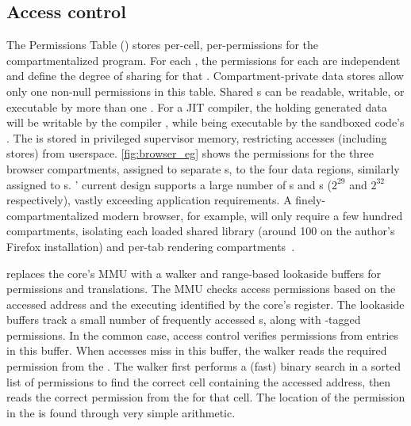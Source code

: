\subsection{Access control}
\label{sec:seccells:design:access_ctl}
The Permissions Table (\ptable) stores 
per-cell, per-\secdiv permissions for the compartmentalized 
program.
For each \cell, the permissions for each \secdiv are independent
and define the degree of sharing for that \cell.
Compartment-private data stores allow only one \secdiv non-null 
permissions in this table.
Shared \cell{}s can be readable, writable, or executable by more than one
\secdiv.
For a JIT compiler, the \cell holding generated data will be writable
by the compiler \secdiv, while being executable by the sandboxed code's
\secdiv.
The \ptable is stored in privileged supervisor memory, restricting
accesses (including stores) from userspace.
\autoref{fig:browser_eg} shows the permissions for the three browser 
compartments, assigned to separate \secdiv{}s, to the four 
data regions, similarly assigned to \cell{}s.
\seccells' current \ptable design supports a large number of 
\secdiv{}s and \cell{}s ($2^{29}$ and $2^{32}$ respectively), 
vastly exceeding application requirements.
A finely-compartmentalized modern browser, for example, will only require
a few hundred compartments, isolating each loaded shared 
library (around 100 on the author's Firefox installation)
and per-tab rendering compartments~\cite{barth2008security}.

\seccells replaces the core's MMU with a \ptable walker and 
range-based lookaside buffers for permissions and translations.
The MMU checks access permissions based on the accessed address and
the executing \secdiv identified by the core's \sid register.
The lookaside buffers track a small number of frequently accessed
\cell{}s, along with \sid-tagged permissions.
In the common case, access control verifies permissions from
entries in this buffer.
When accesses miss in this buffer, the \ptable walker reads the
required permission from the \ptable.
The walker first performs a (fast) binary search in a sorted list of permissions
to find the correct cell containing the accessed address, then
reads the correct permission from the \ptable for that cell.
The location of the permission in the \ptable is found through very 
simple arithmetic.

